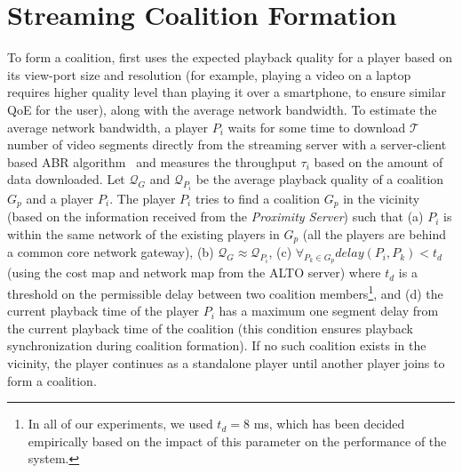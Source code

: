 \section{Streaming Coalition Formation}
To form a coalition, {\our} first uses the expected playback quality for a player based on its view-port size and resolution (for example, playing a video on a laptop requires higher quality level than playing it over a smartphone, to ensure similar QoE for the user), along with the average network bandwidth. To estimate the average network bandwidth, a player $P_i$ waits for some time to download $\mathcal{T}$ number of video segments directly from the streaming server with a server-client based ABR algorithm~\cite{bola2-acm-mmsys2018,yin2015control,mao2017neural} and measures the throughput $\tau_i$ based on the amount of data downloaded.
Let $\mathcal{Q}_G$ and $\mathcal{Q}_{P_i}$ be the average playback quality of a coalition $G_p$ and a player $P_i$. The player $P_i$ tries to find a coalition $G_p$ in the vicinity (based on the information received from the \textit{Proximity Server}) such that (a) $P_i$ is within the same network of the existing players in $G_p$ (all the players are behind a common core network gateway), (b) $\mathcal{Q}_G \approx \mathcal{Q}_{P_i}$, (c) $\forall_{P_k \in G_p} delay(P_i, P_k) < t_d$ (using the cost map and network map from the ALTO server) where $t_d$ is a threshold on the permissible delay between two coalition members\footnote{In all of our experiments, we used $t_d=$8 ms, which has been decided empirically based on the impact of this parameter on the performance of the system.}, and (d) the current playback time of the player $P_i$ has a maximum one segment delay from the current playback time of the coalition (this condition ensures playback synchronization during coalition formation). If no such coalition exists in the vicinity, the player continues as a standalone player until another player joins to form a coalition. 
%

